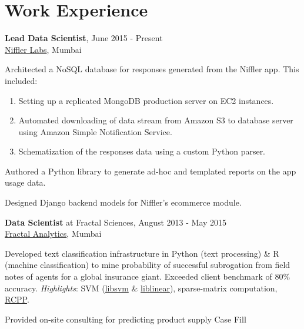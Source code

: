 \documentclass[a4paper,11pt]{article}
\renewenvironment{itemize}{
\begin{list}{}{
  \setlength{\leftmargin}{1.5em}
  }
  }{
\end{list}
}
\begin{document}
\section*{Work Experience}
\small{
\begin{itemize}
  \item \textbf{Lead Data Scientist}, June 2015 - Present \\
    \href{http://niffler.in}{Niffler Labs}, Mumbai
    \begin{itemize}
      \item Architected a NoSQL database for responses generated from the
        Niffler app. This included:
        \begin{enumerate}
            \item Setting up a replicated MongoDB production server on EC2
              instances.
            \item Automated downloading of data stream from Amazon S3 to
              database server using Amazon Simple Notification Service.
            \item Schematization of the responses data using a custom Python
              parser.
        \end{enumerate}
      \item Authored a Python library to generate ad-hoc and templated reports
        on the app usage data.
      \item Designed Django backend models for Niffler's ecommerce module.
    \end{itemize}
    \vspace*{\baselineskip} %
  \item \textbf{Data Scientist} at Fractal Sciences, August 2013 - May 2015 \\
    \href{http://fractalanalytics.com}{Fractal Analytics}, Mumbai
    \begin{itemize}
      \item Developed text classification infrastructure in Python (text
        processing) \& R (machine classification) to mine probability of
        successful subrogation from field notes of agents for a global
        insurance giant. Exceeded client benchmark of 80\% accuracy.
        \emph{Highlights}: SVM
        (\href{http://www.csie.ntu.edu.tw/~cjlin/libsvm/}{libsvm} \&
        \href{http://www.csie.ntu.edu.tw/~cjlin/liblinear/}{liblinear}),
        sparse-matrix computation,
        \href{http://cran.r-project.org/web/packages/Rcpp/index.html}{RCPP}.
      \item Provided on-site consulting for predicting product supply Case Fill

\end{itemize}
\end{itemize}}
\end{document}
